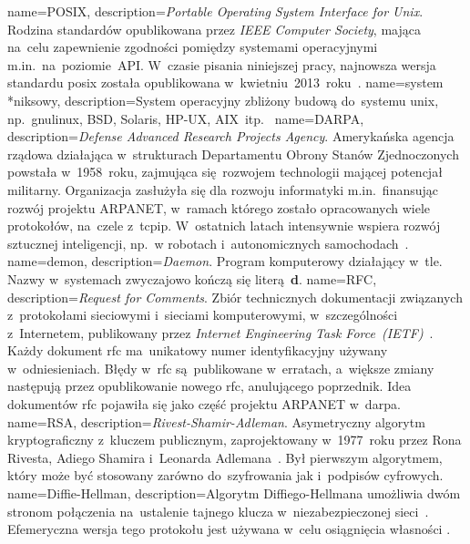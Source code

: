 {
	name={POSIX},
	description={\emph{Portable Operating System Interface for Unix}. Rodzina standardów opublikowana przez \emph{IEEE Computer Society}, mająca na~celu zapewnienie zgodności pomiędzy systemami operacyjnymi m.in.~na~poziomie~API. W~czasie pisania niniejszej pracy, najnowsza wersja standardu \gls{posix} została opublikowana w~kwietniu~2013~roku~\cite{posix-ieee,posix-opengroup}.}
}
{
	name={system \mbox{*niksowy}},
	description={System operacyjny zbliżony budową do~systemu \gls{unix}, np.~\gls{gnulinux}, BSD, Solaris, HP-UX, AIX~itp.~\cite{wiki:unix-like}}
}
{
	name={DARPA},
	description={\emph{Defense Advanced Research Projects Agency}. Amerykańska agencja rządowa działająca w~strukturach Departamentu Obrony Stanów Zjednoczonych powstała w~1958~roku, zajmująca się~rozwojem technologii mającej potencjał militarny. Organizacja zasłużyła się dla rozwoju informatyki m.in.~finansując rozwój projektu ARPANET, w~ramach którego zostało opracowanych wiele protokołów, na~czele z~\gls{tcpip}. W~ostatnich latach intensywnie wspiera rozwój sztucznej inteligencji, np.~w robotach i~autonomicznych samochodach~\cite{darpa-grandchallange,darpa-robotics-challange,darpa-robotics-challange-ieee}.}
}
{
	name={demon},
	description={\emph{Daemon}. Program komputerowy działający w~tle. Nazwy  w~systemach  zwyczajowo kończą się literą~\textbf{d}.}
}
{
	name={RFC},
	description={\emph{Request for Comments}. Zbiór technicznych dokumentacji związanych z~protokołami sieciowymi i~sieciami komputerowymi, w~szczególności z~Internetem, publikowany przez \emph{Internet Engineering Task Force~(IETF)}~\cite{rfc-editor}. Każdy dokument \gls{rfc} ma~unikatowy numer identyfikacyjny używany w~odniesieniach. Błędy w~\gls{rfc} są~publikowane w~erratach, a~większe zmiany następują przez opublikowanie nowego \gls{rfc}, anulującego poprzednik. Idea dokumentów \gls{rfc} pojawiła się jako część projektu ARPANET w~\gls{darpa}.}
}
{
	name={RSA},
	description={\emph{Rivest-Shamir-Adleman}. Asymetryczny algorytm kryptograficzny z~kluczem publicznym, zaprojektowany w~1977~roku przez Rona Rivesta, Adiego Shamira i~Leonarda Adlemana~\cite{wiki:rsa,rsa}. Był pierwszym algorytmem, który może być stosowany zarówno do~szyfrowania jak i~podpisów cyfrowych.}
}
{
	name={Diffie-Hellman},
	description={Algorytm Diffiego-Hellmana umożliwia dwóm stronom połączenia na~ustalenie tajnego klucza w~niezabezpieczonej sieci~\cite{mimuw-ssl-w04}. Efemeryczna wersja tego protokołu jest używana w~celu osiągnięcia własności .}
}
